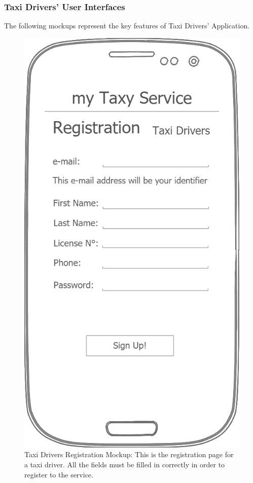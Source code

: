 \documentclass[a4paper]{article}
\begin{document}
\begin{enumerate}[label=\bfseries G\arabic*:]
\subsubsection{Taxi Drivers' User Interfaces}

The following mockups represent the key features of Taxi Drivers' Application.

\begin{figure}[H]
\includegraphics[width=\mockupWidth]{Mockup-TaxiDriversRegistration}
\centering
\caption[Taxi Drivers Registration Mockup]{Taxi Drivers Registration Mockup: \newline This is the registration page for a taxi driver. All the fields must be filled in correctly in order to register to the service.}
\label{fig:mockuptaxidriverregistration}
\end{figure}


\end{enumerate}
\end{document}
